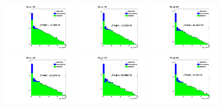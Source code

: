 \documentclass[thesis.tex]{subfiles}
\renewcommand\_{\textunderscore\allowbreak}
\begin{document}
\begin{figure}[hbtp]
   \includegraphics[width=0.32\textwidth]{Figures/frac-45-50_ChIso-DoubleEG-ReMiniAOD.pdf}   \includegraphics[width=0.32\textwidth]{Figures/frac-50-55_ChIso-DoubleEG-ReMiniAOD.pdf}         \includegraphics[width=0.32\textwidth]{Figures/frac-55-60_ChIso-DoubleEG-ReMiniAOD.pdf} \\
   \includegraphics[width=0.32\textwidth]{Figures/frac-60-65_ChIso-DoubleEG-ReMiniAOD.pdf}   \includegraphics[width=0.32\textwidth]{Figures/frac-65-70_ChIso-DoubleEG-ReMiniAOD.pdf}         \includegraphics[width=0.32\textwidth]{Figures/frac-70-80_ChIso-DoubleEG-ReMiniAOD.pdf} \\

\end{figure}
\end{document}
